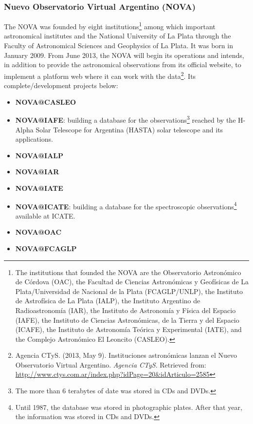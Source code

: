 \subsubsection{Nuevo Observatorio Virtual Argentino (NOVA)}
The NOVA \cite{website:nova-home} was founded by eight institutions\footnote{The
institutions that founded the NOVA are the Observatorio Astron\'{o}mico de
C\'{o}rdova (OAC), the Facultad de Ciencias Astron\'{o}micas y Geof\'{i}sicas de
La Plata/Universidad de Nacional de la Plata (FCAGLP/UNLP), the Instituto de
Astrof\'{i}sica de La Plata (IALP), the Instituto Argentino de
Radioastronom\'{i}a (IAR), the Instituto de Astronom\'{i}a y F\'{i}sica del
Espacio (IAFE), the Instituto de Ciencias Astron\'{o}micas, de la Tierra y del
Espacio (ICAFE), the Instituto de Astronom\'{i}a Te\'{o}rica y Experimental
(IATE), and the Complejo Astron\'{o}mico El Leoncito (CASLEO).} among which
important astronomical institutes and the National University of La Plata
through the Faculty of Astronomical Sciences and Geophysics of La Plata. It was
born in January 2009.  From June 2013, the NOVA will begin its operations and
intends, in addition to provide the astronomical observations from its official
website, to implement a platform web where it can work with the
data\footnote{Agencia CTyS. (2013, May 9). Instituciones astron\'{o}micas lanzan
el Nuevo Observatorio Virtual Argentino. \textit{Agencia CTyS}. Retrieved from:
\url{http://www.ctys.com.ar/index.php?idPage=20&idArticulo=2585}}. Its
complete/development projects below:

\begin{itemize}
\item \textbf{NOVA@CASLEO}

\item \textbf{NOVA@IAFE}:
building a database for the observations\footnote{The more than 6 terabytes of
date was stored in CDs and DVDs.} reached by the H-Alpha Solar Telescope for
Argentina (HASTA) solar telescope and its applications.

\item \textbf{NOVA@IALP}

\item \textbf{NOVA@IAR}

\item \textbf{NOVA@IATE}

\item \textbf{NOVA@ICATE}:
building a database for the spectroscopic observations\footnote{Until 1987, the
database was stored in photographic plates. After that year, the information was
stored in CDs and DVDs.} available at ICATE.

\item \textbf{NOVA@OAC}

\item \textbf{NOVA@FCAGLP}
\end{itemize}

